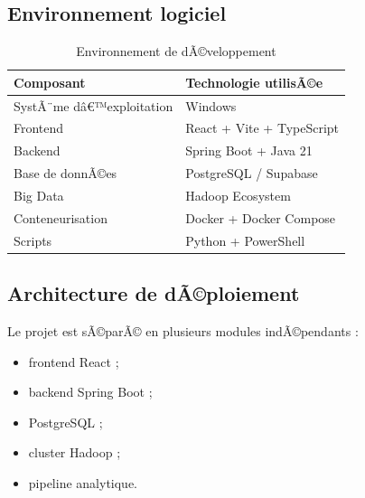 ﻿\documentclass[12pt,a4paper]{report}
\begin{document}
\subsection{Environnement logiciel}

\begin{table}[H]
    \centering
    \caption{Environnement de dÃ©veloppement}

    \begin{tabular}{|p{5cm}|p{6cm}|}
        \hline
        \textbf{Composant} & \textbf{Technologie utilisÃ©e} \\
        \hline

        SystÃ¨me dâ€™exploitation &
        Windows \\
        
        \hline

        Frontend &
        React + Vite + TypeScript \\
        
        \hline

        Backend &
        Spring Boot + Java 21 \\
        
        \hline

        Base de donnÃ©es &
        PostgreSQL / Supabase \\
        
        \hline

        Big Data &
        Hadoop Ecosystem \\
        
        \hline

        Conteneurisation &
        Docker + Docker Compose \\
        
        \hline

        Scripts &
        Python + PowerShell \\
        
        \hline
    \end{tabular}
\end{table}

\subsection{Architecture de dÃ©ploiement}

Le projet est sÃ©parÃ© en plusieurs modules indÃ©pendants :
\begin{itemize}
    \item frontend React ;
    \item backend Spring Boot ;
    \item PostgreSQL ;
    \item cluster Hadoop ;
    \item pipeline analytique.
\end{itemize}
\end{document}
